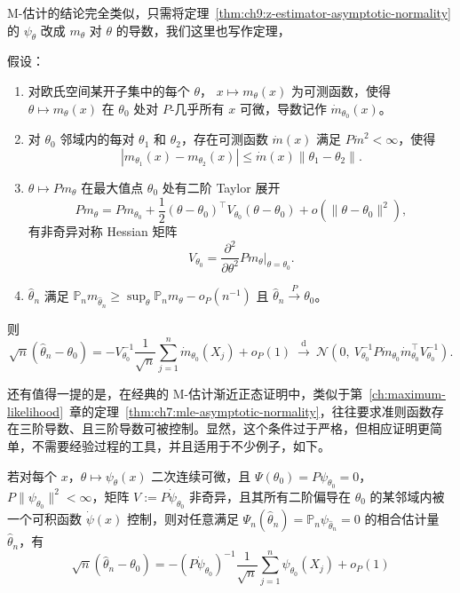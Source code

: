 M-估计的结论完全类似，只需将定理~\ref{thm:ch9:z-estimator-asymptotic-normality} 的 $\psi_\theta$ 改成 $m_\theta$ 对 $\theta$ 的导数，我们这里也写作定理，

\begin{theorem}[M-估计的渐近正态性]\label{thm:ch9:m-estimator-asymptotic-normality}

假设：

\begin{enumerate}
\def\labelenumi{\arabic{enumi}.}
\tightlist
\item
  对欧氏空间某开子集中的每个 $\theta$， $x \mapsto m_\theta(x)$ 为可测函数，使得 $\theta \mapsto m_\theta(x)$ 在 $\theta_0$ 处对 $P$-几乎所有 $x$ 可微，导数记作 $\dot{m}_{\theta_0}(x)$。
\item
  对 $\theta_0$ 邻域内的每对 $\theta_1$ 和 $\theta_2$，存在可测函数 $\dot{m}(x)$ 满足 $P\dot{m} ^2 < \infty$，使得
  \[
  |m_{\theta_1}(x) - m_{\theta_2}(x)| \leq \dot{m}(x)\|\theta_1 - \theta_2\|.
  \]
\item
  $\theta \mapsto Pm_\theta$ 在最大值点 $\theta_0$ 处有二阶 Taylor 展开
  \[
  Pm_\theta = Pm_{\theta_0} + \frac{1}{2}(\theta-\theta_0)^\top V_{\theta_0} (\theta-\theta_0) + o(\|\theta-\theta_0\|^2),
  \]
  有非奇异对称 Hessian 矩阵
  \[
  V_{\theta_0} = \frac{\partial^2}{\partial\theta^2} Pm_\theta \big|_{\theta=\theta_0}.
  \]
\item
  $\widehat\theta_n$ 满足 $\mathbb{P}_n m_{\widehat{\theta}_n} \geq \sup_\theta \mathbb{P}_n m_\theta - o_P(n^{-1})$ 且 $\widehat{\theta}_n \overset{P}{\to} \theta_0$。
\end{enumerate}

则\[\sqrt{n}(\widehat{\theta}_n - \theta_0) = -V_{\theta_0}^{-1} \frac{1}{\sqrt{n}}\sum_{j=1}^n \dot{m}_{\theta_0}(X_j) + o_P(1) \ \overset{\mathrm{d}}{\to}\ \mathcal{N}\left(0,\ V_{\theta_0}^{-1} P\dot{m}_{\theta_0}\dot{m}_{\theta_0}^\top V_{\theta_0}^{-1}\right).\]


\end{theorem}
还有值得一提的是，在经典的 M-估计渐近正态证明中，类似于第~\ref{ch:maximum-likelihood}~章的定理~\ref{thm:ch7:mle-asymptotic-normality}，往往要求准则函数存在三阶导数、且三阶导数可被控制。显然，这个条件过于严格，但相应证明更简单，不需要经验过程的工具，并且适用于不少例子，如下。


\begin{theorem*}[Z-估计渐近正态性的另一表述]

若对每个 $x$，$\theta\mapsto\psi_\theta(x)$ 二次连续可微，且 $\Psi(\theta_0)=P\psi_{\theta_0}=0$，$P\|\psi_{\theta_0}\|^2<\infty$，矩阵 $V:=P\dot{\psi}_{\theta_0}$ 非奇异，且其所有二阶偏导在 $\theta_0$ 的某邻域内被一个可积函数 $\dot{\psi}(x)$ 控制，则对任意满足 $\Psi_n(\widehat{\theta}_n)=\mathbb P_n\psi_{\widehat\theta_n}=0$ 的相合估计量 $\widehat{\theta}_n$，有\[\sqrt{n}(\widehat{\theta}_n-\theta_0) = -(P\dot{\psi}_{\theta_0})^{-1}\frac{1}{\sqrt{n}}\sum_{j=1}^n\psi_{\theta_0}(X_j) + o_P(1)\]
\end{theorem*}

